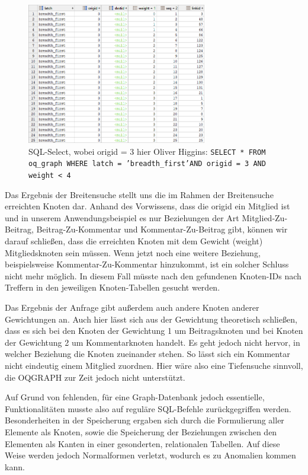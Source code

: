 \begin{figure}	
	\centering
	\includegraphics[width=0.7\textwidth]{images/oqgraph-select.png}
	\caption{SQL-Select, wobei origid = 3 hier Oliver Higgins: \newline
		\texttt{SELECT * FROM oq\_graph WHERE latch = 'breadth\_first'\newline AND origid = 3 AND weight < 4}
	}
\end{figure}

Das Ergebnis der Breitensuche stellt uns die im Rahmen der Breitensuche erreichten Knoten dar. Anhand des Vorwissens, dass die origid ein Mitglied ist und in unserem Anwendungsbeispiel es nur Beziehungen der Art Mitglied-Zu-Beitrag, Beitrag-Zu-Kommentar und Kommentar-Zu-Beitrag gibt, können wir darauf schließen, dass die erreichten Knoten mit dem Gewicht (weight) Mitgliedsknoten sein müssen. Wenn jetzt noch eine weitere Beziehung, beispielsweise \grqq Kommentar-Zu-Kommentar\grqq{} hinzukommt, ist ein solcher Schluss nicht mehr möglich. In diesem Fall müsste nach den gefundenen Knoten-IDs nach Treffern in den jeweiligen Knoten-Tabellen gesucht werden.

Das Ergebnis der Anfrage gibt außerdem auch andere Knoten anderer Gewichtungen an. Auch hier lässt sich aus der Gewichtung theoretisch schließen, dass es sich bei den Knoten der Gewichtung 1 um Beitragsknoten und bei Knoten der Gewichtung 2 um Kommentarknoten handelt. Es geht jedoch nicht hervor, in welcher Beziehung die Knoten zueinander stehen. So lässt sich ein Kommentar nicht eindeutig einem Mitglied zuordnen. Hier wäre also eine Tiefensuche sinnvoll, die OQGRAPH zur Zeit jedoch nicht unterstützt.

Auf Grund von fehlenden, für eine Graph-Datenbank jedoch essentielle, Funktionalitäten musste also auf reguläre SQL-Befehle zurückgegriffen werden. Besonderheiten in der Speicherung ergaben sich durch die Formulierung aller Elemente als Knoten, sowie die Speicherung der Beziehungen zwischen den Elementen als Kanten in einer gesonderten, relationalen Tabellen. Auf diese Weise werden jedoch Normalformen verletzt, wodurch es zu Anomalien kommen kann.

